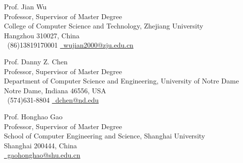 
\begin{cventries}
    \cventry
    {} %
    {} %
    {} %
    {} %
    {
        \vspace{-4.0mm}
        \begin{cvitems} %
            \item { Prof. Jian Wu\\
                        Professor, Supervisor of Master Degree\\
                        College of Computer Science and Technology, Zhejiang University\\
                        Hangzhou 310027, China\\
                        \faPhone \ (86)13819170001 \quad   \href{mailto:wujian2000@zju.edu.cn}{\faEnvelope \ wujian2000@zju.edu.cn}
                  }
            \item { Prof. Danny Z. Chen\\
                        Professor, Supervisor of Master Degree\\
                        Department of Computer Science and Engineering, University of Notre Dame\\
                        Notre Dame, Indiana 46556, USA\\
                        \faPhone \ (574)631-8804 \quad   \href{mailto:dchen@nd.edu}{\faEnvelope \ dchen@nd.edu}
                  }
            \item { Prof. Honghao Gao\\
                        Professor, Supervisor of Master Degree\\
                        School of Computer Engineering and Science, Shanghai University\\
                        Shanghai 200444, China\\
                        \href{mailto:gaohonghao@shu.edu.cn}{\faEnvelope \ gaohonghao@shu.edu.cn}
                  }
        \end{cvitems}
    }

\end{cventries}
